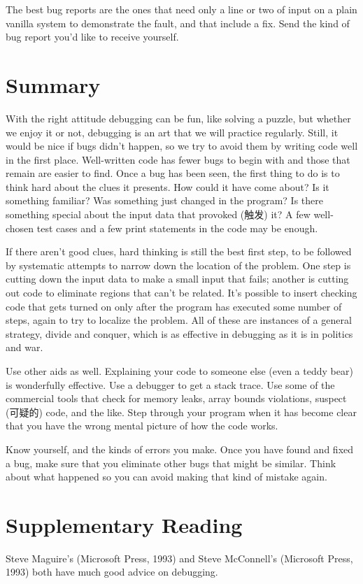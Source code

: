The best bug reports are the ones that need only a line or two of input on
a plain vanilla system to demonstrate the fault, and that include a fix.
Send the kind of bug report you'd like to receive yourself.

\section{Summary}
With the right attitude debugging can be fun, like solving a puzzle, but
whether we enjoy it or not, debugging is an art that we will practice
regularly.  Still, it would be nice if bugs didn't happen, so we try to
avoid them by writing code well in the first place. Well-written code has
fewer bugs to begin with and those that remain are easier to find.  Once a
bug has been seen, the first thing to do is to think hard about the clues
it presents. How could it have come about? Is it something familiar? Was
something just changed in the program? Is there something special about the
input data that provoked (触发) it? A few well-chosen test cases and a few
print statements in the code may be enough. 

If there aren't good clues, hard thinking is still the best first step, to
be followed by systematic attempts to narrow down the location of the
problem. One step is cutting down the input data to make a small input that
fails; another is cutting out code to eliminate regions that can't be
related. It's possible to insert checking code that gets turned on only
after the program has executed some number of steps, again to try to
localize the problem. All of these are instances of a general strategy,
divide and conquer, which is as effective in debugging as it is in politics
and war. 

Use other aids as well. Explaining your code to someone else (even a teddy
bear) is wonderfully effective. Use a debugger to get a stack trace. Use
some of the commercial tools that check for memory leaks, array bounds
violations, suspect (可疑的) code, and the like. Step through your program
when it has become clear that you have the wrong mental picture of how the
code works.

Know yourself, and the kinds of errors you make. Once you have found and
fixed a bug, make sure that you eliminate other bugs that might be similar.
Think about what happened so you can avoid making that kind of mistake
again.

\section*{Supplementary Reading}
Steve Maguire's  (Microsoft Press, 1993) and
Steve McConnell's  (Microsoft Press, 1993) both
have much good advice on debugging.
